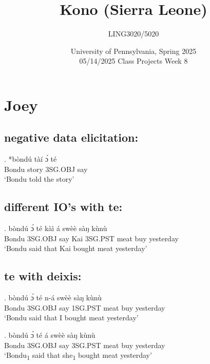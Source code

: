 \documentclass{assets/fieldnotes}
\title{Kono (Sierra Leone)}
\author{LING3020/5020}
\date{University of Pennsylvania, Spring 2025\\05/14/2025 Class Projects Week 8}
\begin{document}
\maketitle

\maketitle
\tableofcontents


\section{Joey}

\subsection{negative data elicitation:}

\exg. *bòndú  tàí ɔ́ té\\
Bondu story 3SG.OBJ say\\
`Bondu told the story' 

\subsection{different IO's with te:}

\exg. bòndú ɔ́ té kàì á swèè sàŋ kùnù\\
Bondu 3SG.OBJ say Kai 3SG.PST meat buy yesterday\\
`Bondu said that Kai bought meat yesterday' 


\subsection{te with deixis:}

\exg. bòndú ɔ́ té n-á swèè sàŋ kùnù\\
Bondu 3SG.OBJ say 1SG.PST meat buy yesterday\\
`Bondu said that I bought meat yesterday' 


\exg. bòndú ɔ́ té á swèè sàŋ kùnù\\
Bondu 3SG.OBJ say 3SG.PST meat buy yesterday\\
`Bondu\textsubscript{1} said that she\textsubscript{1}  bought meat yesterday' 
\end{document}
